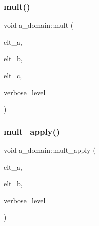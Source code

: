 \mbox{\label{classa__domain_ae587ea71187430b3cfe4868182cd37f5}} 
\subsubsection{\texorpdfstring{mult()}{mult()}}
{\footnotesize\ttfamily void a\+\_\+domain\+::mult (\begin{DoxyParamCaption}\item[{\mbox{\hyperlink{galois_8h_a09fddde158a3a20bd2dcadb609de11dc}{I\+NT}} $\ast$}]{elt\+\_\+a,  }\item[{\mbox{\hyperlink{galois_8h_a09fddde158a3a20bd2dcadb609de11dc}{I\+NT}} $\ast$}]{elt\+\_\+b,  }\item[{\mbox{\hyperlink{galois_8h_a09fddde158a3a20bd2dcadb609de11dc}{I\+NT}} $\ast$}]{elt\+\_\+c,  }\item[{\mbox{\hyperlink{galois_8h_a09fddde158a3a20bd2dcadb609de11dc}{I\+NT}}}]{verbose\+\_\+level }\end{DoxyParamCaption})}

\mbox{\label{classa__domain_a1ae0cdebcf70b7fa1e385f54c4a1164a}} 
\subsubsection{\texorpdfstring{mult\+\_\+apply()}{mult\_apply()}}
{\footnotesize\ttfamily void a\+\_\+domain\+::mult\+\_\+apply (\begin{DoxyParamCaption}\item[{\mbox{\hyperlink{galois_8h_a09fddde158a3a20bd2dcadb609de11dc}{I\+NT}} $\ast$}]{elt\+\_\+a,  }\item[{\mbox{\hyperlink{galois_8h_a09fddde158a3a20bd2dcadb609de11dc}{I\+NT}} $\ast$}]{elt\+\_\+b,  }\item[{\mbox{\hyperlink{galois_8h_a09fddde158a3a20bd2dcadb609de11dc}{I\+NT}}}]{verbose\+\_\+level }\end{DoxyParamCaption})}

\mbox{\label{classa__domain_acb77755f51a7ba0a98fb56e201180e71}} 
